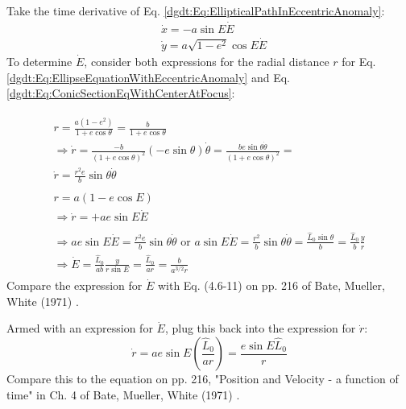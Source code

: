 Take the time derivative of Eq. \ref{dgdt:Eq:EllipticalPathInEccentricAnomaly}:
\begin{equation}
\begin{aligned}
& \dot{x} = -a \sin{E} \dot{E} \\ 
& \dot{y} = a\sqrt{1 - e^2} \cos{E} \dot{E} 
\end{aligned} 
\end{equation}
To determine $\dot{E}$, consider both expressions for the radial distance $r$ for Eq. \ref{dgdt:Eq:EllipseEquationWithEccentricAnomaly} and Eq. \ref{dgdt:Eq:ConicSectionEqWithCenterAtFocus}:

\[
\begin{gathered} 
\begin{gathered} 
	r = \frac{a (1-e^2) }{ 1 + e\cos{\theta}} = \frac{b}{ 1 + e\cos{\theta}} \\
	\Longrightarrow \dot{r} = \frac{ -b}{ (1+e\cos{\theta})^2} (-e\sin{\theta})\dot{\theta} = \frac{ be \sin{\theta} \dot{\theta} }{ (1+ e\cos{\theta})^2 } = \\
		\dot{r} = \frac{r^2 e}{b} \sin{\theta} \dot{\theta}
\end{gathered} \\ 
\begin{gathered}
r = a(1 - e\cos{E}) \\
\Longrightarrow \dot{r}  = +ae\sin{E} \dot{E} 
\end{gathered} \\
\begin{gathered}
\Longrightarrow ae \sin{E} \dot{E} = \frac{r^2 e}{b} \sin{\theta} \dot{\theta} \text{ or } a\sin{E} \dot{E} = \frac{r^2}{b} \sin{\theta} \dot{\theta} = \frac{ \widehat{L}_0 \sin{\theta} }{ b} = \frac{\widehat{L}_0 }{b} \frac{y}{r} \\
\Longrightarrow \dot{E} = \frac{ \widehat{L}_0 }{ab} \frac{y}{r\sin{E}} = \frac{\widehat{L}_0 } {ar} = \frac{ b}{ a^{3/2} r} 
\end{gathered}
\end{gathered} 
\]
Compare the expression for $\dot{E}$ with Eq. (4.6-11) on pp. 216 of Bate, Mueller, White (1971) \cite{dgdt:BMW1971}.

Armed with an expression for $\dot{E}$, plug this back into the expression for $\dot{r}$:
\begin{equation}
\dot{r} = a e \sin{E} \left( \frac{ \widehat{L}_0 }{ ar} \right) = \frac{ e\sin{E} \widehat{L}_0 }{ r}
\end{equation}
Compare this to the equation on pp. 216, "Position and Velocity - a function of time" in Ch. 4 of Bate, Mueller, White (1971) \cite{dgdt:BMW1971}. 

